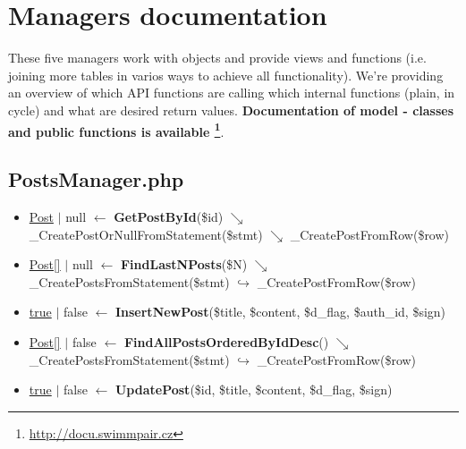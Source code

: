 \section{Managers documentation}
\par These five managers work with objects and provide views and functions (i.e. joining more tables in varios ways to achieve all functionality). We're providing an overview of which API functions are calling which internal functions (plain, in cycle) and what are desired return values.  
\newline
\textbf{Documentation of model - classes and public functions is available \footnote{\url{http://docu.swimmpair.cz}}}.
\subsection{PostsManager.php}
\begin{itemize}
  \setlength\itemsep{0em}
  \item \underline{Post} $\vert$ null $\leftarrow$ \textbf{GetPostById}(\$id)
  \newline    $\searrow$ \_CreatePostOrNullFromStatement(\$stmt)
  \newline    $\searrow$ \_CreatePostFromRow(\$row)
  \item \underline{Post[]} $\vert$ null $\leftarrow$ \textbf{FindLastNPosts}(\$N)
  \newline    $\searrow$ \_CreatePostsFromStatement(\$stmt)
  \newline    $\hookrightarrow$ \_CreatePostFromRow(\$row)
  \item \underline{true} $\vert$ false $\leftarrow$ \textbf{InsertNewPost}(\$title, \$content, \$d\_flag, \$auth\_id, \$sign)
  \item \underline{Post[]} $\vert$ false $\leftarrow$ \textbf{FindAllPostsOrderedByIdDesc}()
  \newline    $\searrow$ \_CreatePostsFromStatement(\$stmt)
  \newline    $\hookrightarrow$ \_CreatePostFromRow(\$row)
  \item \underline{true} $\vert$ false $\leftarrow$ \textbf{UpdatePost}(\$id, \$title, \$content, \$d\_flag, \$sign)
\end{itemize}
